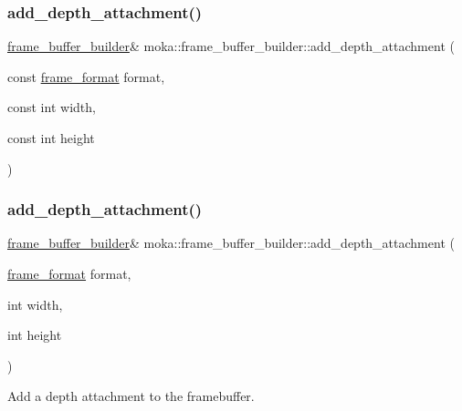 \subsubsection{\texorpdfstring{add\_depth\_attachment()}{add\_depth\_attachment()}\hspace{0.1cm}{\footnotesize\ttfamily [1/2]}}
{\footnotesize\ttfamily \mbox{\hyperlink{structmoka_1_1frame__buffer__builder}{frame\+\_\+buffer\+\_\+builder}}\& moka\+::frame\+\_\+buffer\+\_\+builder\+::add\+\_\+depth\+\_\+attachment (\begin{DoxyParamCaption}\item[{const \mbox{\hyperlink{namespacemoka_a2ce6b5e22cd8e423713ef76033a279de}{frame\+\_\+format}}}]{format,  }\item[{const int}]{width,  }\item[{const int}]{height }\end{DoxyParamCaption})\hspace{0.3cm}{\ttfamily [inline]}}

\mbox{\label{structmoka_1_1frame__buffer__builder_a067deb066a108ea267a66a5eb5686f47}} 
\subsubsection{\texorpdfstring{add\_depth\_attachment()}{add\_depth\_attachment()}\hspace{0.1cm}{\footnotesize\ttfamily [2/2]}}
{\footnotesize\ttfamily \mbox{\hyperlink{structmoka_1_1frame__buffer__builder}{frame\+\_\+buffer\+\_\+builder}}\& moka\+::frame\+\_\+buffer\+\_\+builder\+::add\+\_\+depth\+\_\+attachment (\begin{DoxyParamCaption}\item[{\mbox{\hyperlink{namespacemoka_a2ce6b5e22cd8e423713ef76033a279de}{frame\+\_\+format}}}]{format,  }\item[{int}]{width,  }\item[{int}]{height }\end{DoxyParamCaption})}



Add a depth attachment to the framebuffer. 


